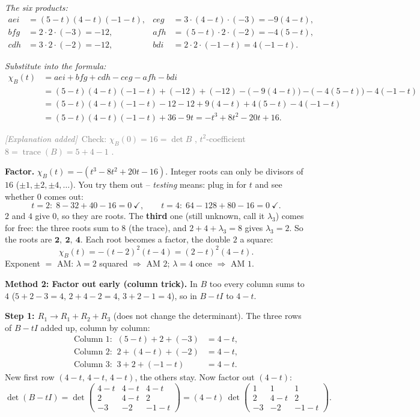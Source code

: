\documentclass[a4paper,12pt]{article}
\newcommand{\erglerk}{\textcolor{gray}{\small\textit{[Explanation added]}}}
\begin{document}
\emph{The six products:}
\begin{align*}
aei &= (5-t)(4-t)(-1-t), & ceg &= 3\cdot(4-t)\cdot(-3) = -9(4-t), \\
bfg &= 2\cdot 2\cdot(-3) = -12, & afh &= (5-t)\cdot 2\cdot(-2) = -4(5-t), \\
cdh &= 3\cdot 2\cdot(-2) = -12, & bdi &= 2\cdot 2\cdot(-1-t) = 4(-1-t).
\end{align*}

\emph{Substitute into the formula:}
\begin{align*}
\chi_B(t) &= aei + bfg + cdh - ceg - afh - bdi \\
&= (5-t)(4-t)(-1-t) + (-12) + (-12) - \big(-9(4-t)\big) - \big(-4(5-t)\big) - 4(-1-t) \\
&= (5-t)(4-t)(-1-t) - 12 - 12 + 9(4-t) + 4(5-t) - 4(-1-t) \\
&= (5-t)(4-t)(-1-t) + 36 - 9t = -t^3 + 8t^2 - 20t + 16.
\end{align*}

\erglerk\ \textcolor{gray}{\small Check: $\chi_B(0) = 16 = \det B$ \checkmark, $t^2$-coefficient $8 = \operatorname{trace}(B) = 5+4-1$ \checkmark.}

\textbf{Factor.} $\chi_B(t) = -(t^3 - 8t^2 + 20t - 16)$. Integer roots can only be divisors of $16$ ($\pm1, \pm2, \pm4, \dots$). You try them out -- \emph{testing} means: plug in for $t$ and see whether $0$ comes out:
\[
t = 2:\; 8 - 32 + 40 - 16 = 0\ \checkmark, \qquad t = 4:\; 64 - 128 + 80 - 16 = 0\ \checkmark.
\]
$2$ and $4$ give $0$, so they are roots. The \textbf{third} one (still unknown, call it $\lambda_3$) comes for free: the three roots sum to $8$ (the trace), and $2 + 4 + \lambda_3 = 8$ gives $\lambda_3 = 2$. So the roots are $\mathbf{2,\ 2,\ 4}$. Each root becomes a factor, the double $2$ a square:
\[
\boxed{\chi_B(t) = -(t-2)^2(t-4) = (2-t)^2(4-t).}
\]
Exponent $=$ AM: $\lambda = 2$ squared $\Rightarrow$ AM $2$; $\lambda = 4$ once $\Rightarrow$ AM $1$.

\textbf{Method 2: Factor out early (column trick).} In $B$ too every column sums to $4$ ($5+2-3=4$, $2+4-2=4$, $3+2-1=4$), so in $B - tI$ to $4 - t$.

\textbf{Step 1: $R_1 \to R_1 + R_2 + R_3$} (does not change the determinant). The three rows of $B - tI$ added up, column by column:
\begin{align*}
\text{Column 1:}\;\; (5-t) + 2 + (-3) &= 4 - t, \\
\text{Column 2:}\;\; 2 + (4-t) + (-2) &= 4 - t, \\
\text{Column 3:}\;\; 3 + 2 + (-1-t) &= 4 - t.
\end{align*}
New first row $(4-t,\, 4-t,\, 4-t)$, the others stay. Now factor out $(4-t)$:
\[
\det(B - tI) = \det\!\begin{pmatrix} 4-t & 4-t & 4-t \\ 2 & 4-t & 2 \\ -3 & -2 & -1-t \end{pmatrix}
= (4-t)\,\det\!\begin{pmatrix} 1 & 1 & 1 \\ 2 & 4-t & 2 \\ -3 & -2 & -1-t \end{pmatrix}.
\]
\end{document}
